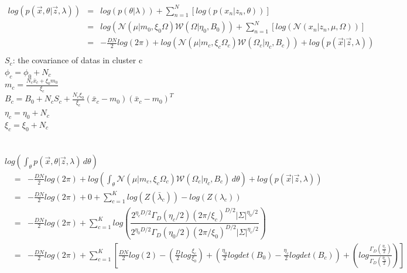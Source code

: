 \documentclass{article}
\begin{document}
\begin{spacing}{1.1}
\begin{eqnarray*} 
log(p(\vec x,\theta|\vec z, \lambda))
& = & log(p(\theta|\lambda))+\sum_{n=1}^{N}[log(p(x_{n}|z_{n},\theta))]\\ 
& = & log(\mathcal{N}(\mu|m_{0},\xi_{0}\Omega)\mathcal{W}(\Omega|\eta_{0},B_{0}))+\sum_{n=1}^{N}[log(\mathcal{N}(x_{n}|z_{n},\mu,\Omega))]\\ 
& = & -\frac{DN}{2}log(2\pi)+log(\mathcal{N}(\mu|m_{c},\xi_{c}\Omega_{c})\mathcal{W}(\Omega_{c}|\eta_{c},B_{c}))+log(p(\vec x|\vec z, \lambda)) \\
\end{eqnarray*}
$S_{c}$: the covariance of datas in cluster c\\ 
$\phi_{c}=\phi_{0}+N_{c}$\\
$m_{c}=\frac{N_{c}\bar x_{c}+\xi_{0}m_{0}}{\xi_{c}}$\\
$B_{c}=B_{0}+N_{c}S_{c}+\frac{N_{c}\xi_{0}}{\xi_{c}}(\bar x_{c}-m_{0})(\bar x_{c}-m_{0})^{T}$\\
$\eta_{c}=\eta_{0}+N_{c}$\\
$\xi_{c}=\xi_{0}+N_{c}$\\ \\ \\
$log(\int_\theta \! p(\vec x,\theta|\vec z,\lambda) \, d\theta)$\\
\begin{eqnarray*} 
& = & -\frac{DN}{2}log(2\pi)+log(\int_\theta \! \mathcal{N}(\mu|m_{c},\xi_{c}\Omega_{c})\mathcal{W}(\Omega_{c}|\eta_{c},B_{c}) \, d\theta)+log( p(\vec x|\vec z, \lambda))\\
& = & -\frac{DN}{2}log(2\pi)+0+\sum_{c=1}^{K}log(Z(\bar \lambda_{c}))-log(Z( \lambda_{c}))\\
& = & -\frac{DN}{2}log(2\pi)+\sum_{c=1}^{K}log(\dfrac{2^{\eta_{c}D/2}\Gamma_{D}(\eta_{c}/2)(2\pi/\xi_{c})^{D/2}\lvert\Sigma\lvert^{\eta_{0}/2}}{2^{\eta_{0}D/2}\Gamma_{D}(\eta_{0}/2)(2\pi/\xi_{0})^{D/2}\lvert\Sigma\lvert^{\eta_{c}/2}})\\ 
& = & -\frac{DN}{2}log(2\pi)+\sum_{c=1}^{K}[\frac{DN}{2}log(2)-(\frac{D}{2}log\frac{\xi_{c}}{\xi_{0}})+(\frac{\eta_{0}}{2}log det(B_{0})
-\frac{\eta_{c}}{2}log det(B_{c}))+(log \frac{\Gamma_{D}(\frac{\eta_{c}}{2})}{\Gamma_{D}(\frac{\eta_{0}}{2})})]
\end{eqnarray*}


\end{spacing}
\end{document}
